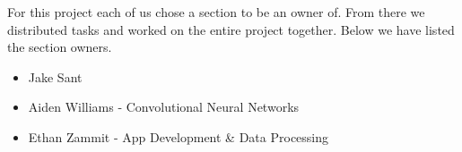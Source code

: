For this project each of us chose a section to be an owner of.
From there we distributed tasks and worked on the entire project together.
Below we have listed the section owners.

\begin{itemize}

    \item Jake Sant

    \item Aiden Williams - Convolutional Neural Networks

    \item Ethan Zammit - App Development \& Data Processing

\end{itemize}